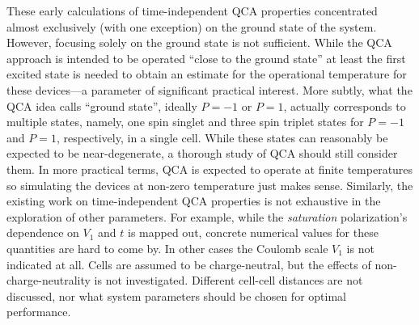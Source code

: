 These early calculations of time-independent QCA properties concentrated almost
exclusively (with one exception) on the ground state of the system. However,
focusing solely on the ground state is not sufficient. While the QCA approach is
intended to be operated ``close to the ground state'' at least the first excited
state is needed to obtain an estimate for the operational temperature for these
devices---a parameter of significant practical interest. More subtly, what the
QCA idea calls ``ground state'', ideally $P=-1$ or $P=1$, actually corresponds
to multiple states, namely, one spin singlet and three spin triplet states for
$P=-1$ and $P=1$, respectively, in a single cell. While these states can
reasonably be expected to be near-degenerate, a thorough study of QCA should
still consider them. In more practical terms, QCA is expected to operate at
finite temperatures so simulating the devices at non-zero temperature just makes
sense. Similarly, the existing work on time-independent QCA properties is not
exhaustive in the exploration of other parameters. For example, while the
\emph{saturation} polarization's dependence on $V_1$ and $t$ is mapped out,
concrete numerical values for these quantities are hard to come by. In other
cases the Coulomb scale $V_1$ is not indicated at all. Cells are assumed to be
charge-neutral, but the effects of non-charge-neutrality is not investigated.
Different cell-cell distances are not discussed, nor what system parameters
should be chosen for optimal performance.

